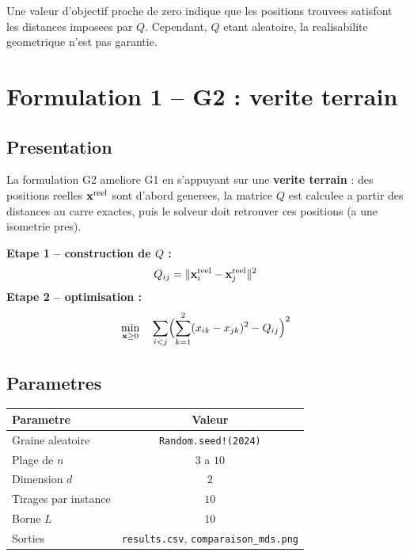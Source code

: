 \documentclass[12pt,a4paper]{article}
\begin{document}
\begin{resultbox}
Une valeur d'objectif proche de zero indique que les positions trouvees
satisfont les distances imposees par $Q$.  Cependant, $Q$ etant
aleatoire, la realisabilite geometrique n'est pas garantie.
\end{resultbox}

\newpage

\section{Formulation 1 -- G2 : verite terrain}

\subsection{Presentation}

La formulation G2 ameliore G1 en s'appuyant sur une
\textbf{verite terrain} : des positions reelles $\mathbf{x}^{\rm reel}$
sont d'abord generees, la matrice $Q$ est calculee a partir des
distances au carre exactes, puis le solveur doit retrouver ces positions
(a une isometrie pres).

\begin{objetifbox}
\textbf{Etape 1 -- construction de $Q$ :}
\[
  Q_{ij} = \|\mathbf{x}_i^{\rm reel} - \mathbf{x}_j^{\rm reel}\|^2
\]
\textbf{Etape 2 -- optimisation :}
\[
  \min_{\mathbf{x} \geq 0} \quad
  \sum_{i < j}
  \Bigl(
    \sum_{k=1}^{2} (x_{ik} - x_{jk})^2 - Q_{ij}
  \Bigr)^2
\]
\end{objetifbox}

\subsection{Parametres}

\begin{center}
\begin{tabular}{lc}
\toprule
\textbf{Parametre} & \textbf{Valeur} \\
\midrule
Graine aleatoire       & \texttt{Random.seed!(2024)} \\
Plage de $n$           & $3$ a $10$ \\
Dimension $d$          & $2$ \\
Tirages par instance   & $10$ \\
Borne $L$              & $10$ \\
Sorties                & \texttt{results.csv}, \texttt{comparaison\_mds.png} \\
\bottomrule
\end{tabular}
\end{center}
\end{document}
